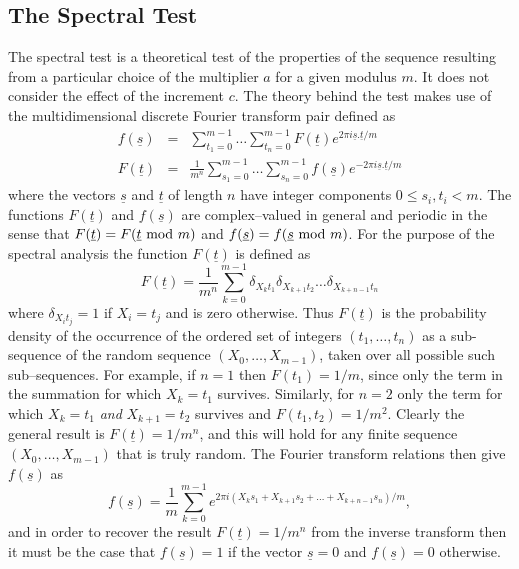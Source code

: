 \documentclass[dvips]{article}
\begin{document}
\subsection*{The Spectral Test}
The spectral test is a theoretical test of the properties of
the sequence resulting from a particular choice of the
multiplier $a$ for a given modulus $m$.  It does not consider the effect
of the increment $c$. 
The theory behind the test makes use of the multidimensional discrete
Fourier transform pair defined as
\begin{eqnarray}
f(\underline{s}) & = & \sum_{t_{1}=0}^{m-1}\dots \sum_{t_{n}=0}^{m-1}
F(\underline{t}) e^{2\pi i \underline{s}.\underline{t}/m}
\nonumber \\
F(\underline{t}) & = & \frac{1}{m^{n}}\sum_{s_{1}=0}^{m-1}\dots
\sum_{s_{n}=0}^{m-1}
f(\underline{s}) e^{-2\pi i \underline{s}.\underline{t}/m}
\nonumber
\end{eqnarray}
where the vectors $\underline{s}$ and $\underline{t}$ of length $n$ have
integer components $0 \le s_{i},t_{i} < m$.  The functions
$F(\underline{t})$ and $f(\underline{s})$ are complex--valued in general and
periodic in the sense that $F(\underline{t}) = F(\underline{t} \ {\rm
mod} \ m)$ and $f(\underline{s}) = f(\underline{s} \ {\rm mod} \ m)$.
For the purpose of the spectral analysis the function $F(\underline{t})$
is defined as
\[
F(\underline{t}) =
\frac{1}{m^{n}}\sum_{k=0}^{m-1}\delta_{X_{k}t_{1}}\delta_{X_{k+1}t_{2}}\ldots
\delta_{X_{k+n-1}t_{n}}
\]
where $\delta_{X_{i}t_{j}} = 1$ if $X_{i}=t_{j}$ and is zero otherwise.
Thus $F(\underline{t})$ is the probability density of the occurrence of the
ordered set of integers $(t_{1},\ldots, t_{n})$ as a sub-sequence of the 
random sequence $(X_{0},\ldots, X_{m-1})$, taken over all possible such
sub--sequences.  For example, if
$n=1$ then $F(t_{1}) = 1/m$, since only the term in the summation for which
$X_{k}=t_{1}$ survives.  Similarly, for $n=2$ only the term for which
$X_{k}=t_{1}$ {\it and} $X_{k+1}=t_{2}$ survives and $F(t_{1},t_{2})=1/m^{2}$.
Clearly the general result is $F(\underline{t})=1/m^{n}$, and this
will hold for any finite sequence $(X_{0},\ldots, X_{m-1})$ 
that is truly random.
The Fourier transform relations then give $f(\underline{s})$ as
\begin{equation}
f(\underline{s}) = \frac{1}{m} \sum_{k=0}^{m-1} e^{2\pi i
(X_{k}s_{1} + X_{k+1}s_{2} + \dots + X_{k+n-1}s_{n})/m},
\label{fsdef}
\end{equation} 
and in order to recover the result $F(\underline{t})=1/m^{n}$ from the
inverse transform then it must be the case that $f(\underline{s}) = 1$
if the vector $\underline{s} = 0$ and $f(\underline{s}) = 0$ otherwise.
\end{document}

